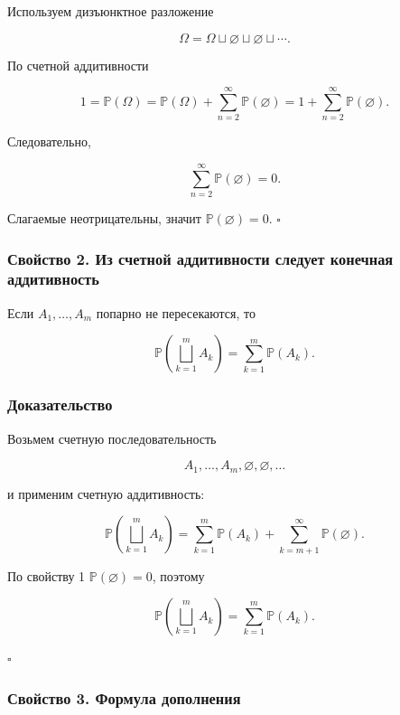 \documentclass[
  11pt,
  a4paper,
]{article}
\begin{document}
Используем дизъюнктное разложение

\[
\Omega=\Omega\sqcup\varnothing\sqcup\varnothing\sqcup\cdots.
\]

По счетной аддитивности

\[
1=\mathbb P(\Omega)
=
\mathbb P(\Omega)+\sum_{n=2}^{\infty}\mathbb P(\varnothing)
=
1+\sum_{n=2}^{\infty}\mathbb P(\varnothing).
\]

Следовательно,

\[
\sum_{n=2}^{\infty}\mathbb P(\varnothing)=0.
\]

Слагаемые неотрицательны, значит \(\mathbb P(\varnothing)=0\).
\(\square\)

\subsubsection{Свойство 2. Из счетной аддитивности следует конечная
аддитивность}\label{ux441ux432ux43eux439ux441ux442ux432ux43e-2.-ux438ux437-ux441ux447ux435ux442ux43dux43eux439-ux430ux434ux434ux438ux442ux438ux432ux43dux43eux441ux442ux438-ux441ux43bux435ux434ux443ux435ux442-ux43aux43eux43dux435ux447ux43dux430ux44f-ux430ux434ux434ux438ux442ux438ux432ux43dux43eux441ux442ux44c}

Если \(A_1,\ldots,A_m\) попарно не пересекаются, то

\[
\mathbb P\left(\bigsqcup_{k=1}^{m}A_k\right)
=
\sum_{k=1}^{m}\mathbb P(A_k).
\]

\subsubsection{Доказательство}\label{ux434ux43eux43aux430ux437ux430ux442ux435ux43bux44cux441ux442ux432ux43e-1}

Возьмем счетную последовательность

\[
A_1,\ldots,A_m,\varnothing,\varnothing,\ldots
\]

и применим счетную аддитивность:

\[
\mathbb P\left(\bigsqcup_{k=1}^{m}A_k\right)
=
\sum_{k=1}^{m}\mathbb P(A_k)+\sum_{k=m+1}^{\infty}\mathbb P(\varnothing).
\]

По свойству 1 \(\mathbb P(\varnothing)=0\), поэтому

\[
\mathbb P\left(\bigsqcup_{k=1}^{m}A_k\right)
=
\sum_{k=1}^{m}\mathbb P(A_k).
\]

\(\square\)

\subsubsection{Свойство 3. Формула
дополнения}\label{ux441ux432ux43eux439ux441ux442ux432ux43e-3.-ux444ux43eux440ux43cux443ux43bux430-ux434ux43eux43fux43eux43bux43dux435ux43dux438ux44f}
\end{document}

